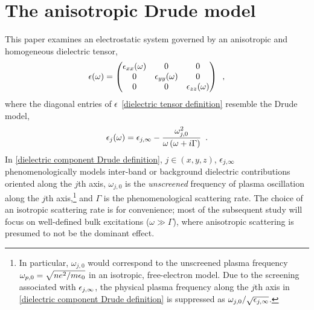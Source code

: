 \section{The anisotropic Drude model}

This paper examines an electrostatic system governed by an anisotropic and homogeneous dielectric tensor,
\begin{equation}
    \label{dielectric tensor definition}
    \epsilon(\omega) = \begin{pmatrix}
    \epsilon_{xx}(\omega) & 0 & 0
    \\ 0 & \epsilon_{yy}(\omega) & 0
    \\ 0 & 0 & \epsilon_{zz}(\omega)
    \end{pmatrix}
    \,\,\,,
\end{equation}
where the diagonal entries of $\epsilon$ \eqref{dielectric tensor definition} resemble the Drude model,
\begin{equation}
    \label{dielectric component Drude definition}
    \epsilon_j(\omega) = \epsilon_{j,\infty}-\frac{\omega_{j,0}^2}{\omega\left(\omega+i\Gamma\right)}\,\,\,.
\end{equation}
In \eqref{dielectric component Drude definition}, $j\in(x,y,z)$, $\epsilon_{j,\infty}$ phenomenologically models inter-band or background dielectric contributions oriented along the $j$th axis, $\omega_{j,0}$ is the {\it unscreened} frequency of plasma oscillation along the $j$th axis,\footnote{In particular, $\omega_{j,0}$ would correspond to the unscreened plasma frequency $\omega_{p,0}=\sqrt{ne^2/m\epsilon_0}$ in an isotropic, free-electron model.  Due to the screening associated with $\epsilon_{j,\infty}$, the physical plasma frequency along the $j$th axis in \eqref{dielectric component Drude definition} is suppressed as $\omega_{j,0}/\sqrt{\epsilon_{j,\infty}}$.} and $\Gamma$ is the phenomenological scattering rate.  The choice of an isotropic scattering rate is for convenience; most of the subsequent study will focus on well-defined bulk excitations ($\omega\gg\Gamma$), where anisotropic scattering is presumed to not be the dominant effect.





